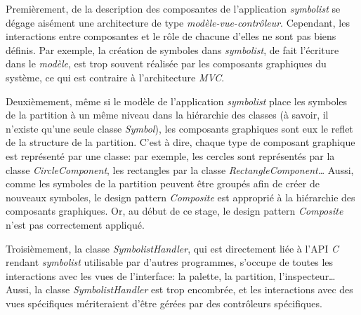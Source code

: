 Premièrement, de la description des composantes de l'application \textit{symbolist} se dégage aisément une architecture de type \textit{modèle-vue-contrôleur}. Cependant, les interactions entre composantes et le rôle de chacune d'elles ne sont pas biens définis. Par exemple, la création de symboles dans \textit{symbolist}, de fait l'écriture dans le \textit{modèle}, est trop souvent réalisée par les composants graphiques du système, ce qui est contraire à l'architecture \textit{MVC}. 

Deuxièmement, même si le modèle de l'application \textit{symbolist} place les symboles de la partition à un même niveau dans la hiérarchie des classes (à savoir, il n'existe qu'une seule classe \textit{Symbol}), les composants graphiques sont eux le reflet de la structure de la partition.
C'est à dire, chaque type de composant graphique est représenté par une classe: par exemple, les cercles sont représentés par la classe \textit{CircleComponent}, les rectangles par la classe \textit{RectangleComponent}…
Aussi, comme les symboles de la partition peuvent être groupés afin de créer de nouveaux symboles, le design pattern \textit{Composite} est approprié à la hiérarchie des composants graphiques. 
Or, au début de ce stage, le design pattern \textit{Composite} n'est pas correctement appliqué. 

Troisièmement, la classe \textit{SymbolistHandler}, qui est directement liée à l'API \textit{C} rendant \textit{symbolist} utilisable par d'autres programmes, s'occupe de toutes les interactions avec les vues de l'interface: la palette, la partition, l'inspecteur… Aussi, la classe \textit{SymbolistHandler} est trop encombrée, et les interactions avec des vues spécifiques mériteraient d'être gérées par des contrôleurs spécifiques.
